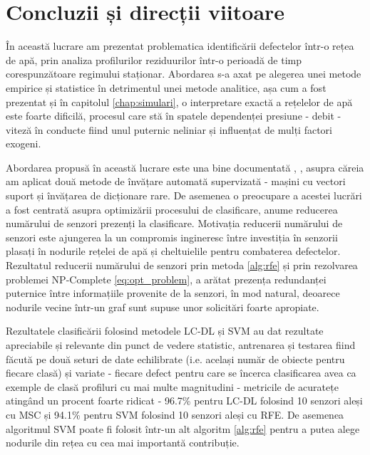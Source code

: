 \chapter{Concluzii și direcții viitoare}
\label{chap:conclusions}

În această lucrare am prezentat problematica identificării defectelor într-o rețea de apă, prin analiza profilurilor reziduurilor într-o perioadă de timp corespunzătoare regimului staționar. Abordarea s-a axat pe alegerea unei metode empirice și statistice în detrimentul unei metode analitice, așa cum a fost prezentat și în capitolul \ref{chap:simulari}, o interpretare exactă a rețelelor de apă este foarte dificilă, procesul care stă în spatele dependenței presiune - debit - viteză în conducte fiind unul puternic neliniar și influențat de mulți factori exogeni. 

Abordarea propusă în această lucrare este una bine documentată \cite{irofti2017dictionary}, \cite{perelman2016sensor}, \cite{rossman2000epanet} asupra căreia am aplicat două metode de învățare automată supervizată - mașini cu vectori suport și învățarea de dicționare rare. De asemenea o preocupare a acestei lucrări a fost centrată asupra optimizării procesului de clasificare, anume reducerea numărului de senzori prezenți la clasificare. Motivația reducerii numărului de senzori este ajungerea la un compromis ingineresc între investiția în senzorii plasați în nodurile rețelei de apă și cheltuielile pentru combaterea defectelor. Rezultatul reducerii numărului de senzori prin metoda \eqref{alg:rfe} și prin rezolvarea problemei NP-Complete \eqref{eq:opt_problem}, a arătat prezența redundanței puternice între informațiile provenite de la senzori, în mod natural, deoarece nodurile vecine într-un graf sunt supuse unor solicitări foarte apropiate.

Rezultatele clasificării folosind metodele LC-DL și SVM au dat rezultate apreciabile și relevante din punct de vedere statistic, antrenarea și testarea fiind făcută pe două seturi de date echilibrate (i.e. același număr de obiecte pentru fiecare clasă) și variate - fiecare defect pentru care se încerca clasificarea avea ca exemple de clasă profiluri cu mai multe magnitudini - metricile de acuratețe atingând un procent foarte ridicat - 96.7\% pentru LC-DL folosind 10 senzori aleși cu MSC și 94.1\% pentru SVM folosind 10 senzori aleși cu RFE. De asemenea algoritmul SVM poate fi folosit într-un alt algoritm \ref{alg:rfe} pentru a putea alege nodurile din rețea cu cea mai importantă contribuție.

